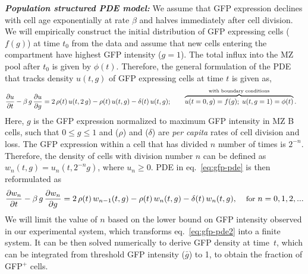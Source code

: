 \documentclass[11pt]{article}
\begin{document}
\textbf{\textit{Population structured PDE model:}}
We assume that GFP expression declines with cell age exponentially at rate $\beta$ and halves immediately after cell division.
We will empirically construct the initial distribution of GFP expressing cells ($f(g)$) at time $t_{0}$ from the data and
assume that new cells entering the compartment have highest GFP intensity ($g=1$).
The total influx into the MZ pool after $t_0$ is given by $\phi(t)$.
Therefore, the general formulation of the PDE that tracks density $u(t, g)$  of GFP expressing cells at time $t$ is given as,
\begin{equation}
\begin{aligned}
\small
\frac{\partial u}{\partial t}  - \beta \,g \, \frac{\partial u}{\partial g} = 2\,  \rho(t) & \, u(t, 2\,g) - \rho(t) \, u(t, g) - \delta(t)  \, u(t, g); 
\qquad \overbrace{ u(t=0, g) = f(g); \; u(t, g=1) = \phi(t)}^{\text{with boundary conditions}}.
\label{eq:gfp-pde}
\end{aligned}
\end{equation}
Here, $g$ is the GFP expression normalized to maximum GFP intensity in MZ B cells, such that $0 \le g \le 1$ and ($\rho$) and ($\delta$) are \textit{per capita} rates of cell division and loss.
The GFP expression within a cell that has divided $n$ number of times is $2^{-n}$. 
Therefore, the density of cells with division number $n$ can be defined as $w_{n}(t, g) = u_{n}(t, 2^{-n} g)$, where $u_{n} \ge 0$. %
PDE in eq.~\ref{eq:gfp-pde} is then reformulated as
\begin{equation} 
\small
\frac{\partial w_{n}}{\partial t}  - \beta \,g \, \frac{\partial w_{n}}{\partial g} = 2\, \rho(t)  \, w_{n-1}(t, g) - \rho(t) \, w_{n}(t, g)  - \delta(t)  \, w_{n}(t, g), \quad \, \text{for } n = 0, 1, 2, ...
\label{eq:gfp-pde2}
\end{equation}
We will limit the value of $n$ based on the lower bound on GFP intensity observed in our experimental system, which transforms {eq.~\ref{eq:gfp-pde2}} into a finite system.
It can be then solved numerically to derive GFP density at time~$t$, which can be integrated from threshold GFP intensity ($\bar{g}$) to 1, to obtain the fraction of GFP$^{+}$ cells. 
\end{document}
